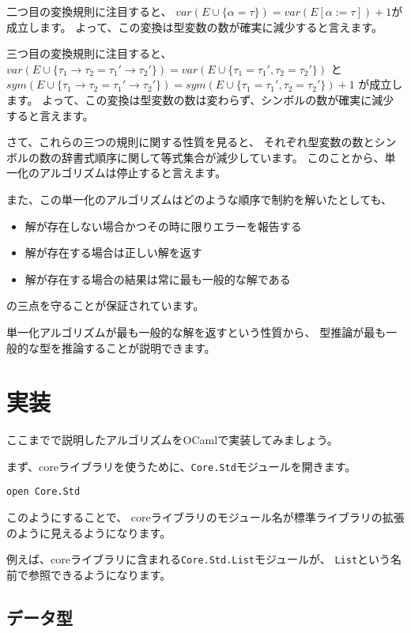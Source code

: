二つ目の変換規則に注目すると、
$\mathit{var}(E \cup \{\alpha = \tau\}) = \mathit{var}(E[\alpha := \tau])+1$が成立します。
よって、この変換は型変数の数が確実に減少すると言えます。

三つ目の変換規則に注目すると、
$\mathit{var}(E \cup \{\tau_1 \to \tau_2 = \tau_1' \to \tau_2'\}) =
\mathit{var}(E \cup \{\tau_1 = \tau_1', \tau_2 = \tau_2'\})$
と
$\mathit{sym}(E \cup \{\tau_1 \to \tau_2 = \tau_1' \to \tau_2'\}) =
\mathit{sym}(E \cup \{\tau_1 = \tau_1', \tau_2 = \tau_2'\})+1$
が成立します。
よって、この変換は型変数の数は変わらず、シンボルの数が確実に減少すると言えます。

さて、これらの三つの規則に関する性質を見ると、
それぞれ型変数の数とシンボルの数の辞書式順序に関して等式集合が減少しています。
このことから、単一化のアルゴリズムは停止すると言えます。

また、この単一化のアルゴリズムはどのような順序で制約を解いたとしても、
\begin{itemize}
  \item 解が存在しない場合かつその時に限りエラーを報告する
  \item 解が存在する場合は正しい解を返す
  \item 解が存在する場合の結果は常に最も一般的な解である
\end{itemize}
の三点を守ることが保証されています。

単一化アルゴリズムが最も一般的な解を返すという性質から、
型推論が最も一般的な型を推論することが説明できます。

\section{実装}

ここまでで説明したアルゴリズムをOCamlで実装してみましょう。

まず、coreライブラリを使うために、\texttt{Core.Std}モジュールを開きます。

\begin{lstlisting}
open Core.Std
\end{lstlisting}

このようにすることで、
coreライブラリのモジュール名が標準ライブラリの拡張のように見えるようになります。

例えば、coreライブラリに含まれる\texttt{Core.Std.List}モジュールが、
\texttt{List}という名前で参照できるようになります。

\subsection{データ型}

